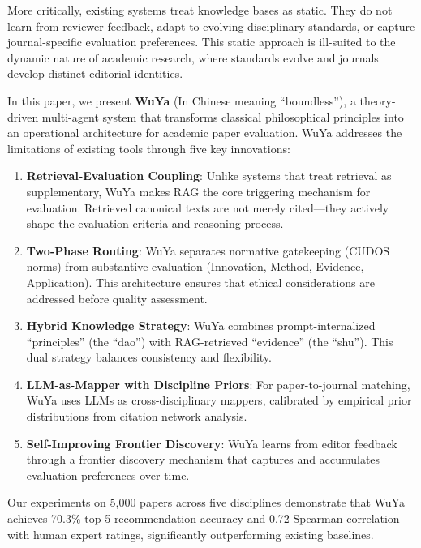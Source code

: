 \documentclass[11pt,a4paper]{article}
\newcommand{\rag}{RAG}
\begin{document}
More critically, existing systems treat knowledge bases as static. They do not learn from reviewer feedback, adapt to evolving disciplinary standards, or capture journal-specific evaluation preferences. This static approach is ill-suited to the dynamic nature of academic research, where standards evolve and journals develop distinct editorial identities.

In this paper, we present \textbf{WuYa} (In Chinese meaning ``boundless''), a theory-driven multi-agent system that transforms classical philosophical principles into an operational architecture for academic paper evaluation. WuYa addresses the limitations of existing tools through five key innovations:

\begin{enumerate}
    \item \textbf{Retrieval-Evaluation Coupling}: Unlike systems that treat retrieval as supplementary, WuYa makes \rag{} the core triggering mechanism for evaluation. Retrieved canonical texts are not merely cited---they actively shape the evaluation criteria and reasoning process.
    
    \item \textbf{Two-Phase Routing}: WuYa separates normative gatekeeping (CUDOS norms) from substantive evaluation (Innovation, Method, Evidence, Application). This architecture ensures that ethical considerations are addressed before quality assessment.
    
    \item \textbf{Hybrid Knowledge Strategy}: WuYa combines prompt-internalized ``principles'' (the ``dao'') with \rag{}-retrieved ``evidence'' (the ``shu''). This dual strategy balances consistency and flexibility.
    
    \item \textbf{LLM-as-Mapper with Discipline Priors}: For paper-to-journal matching, WuYa uses LLMs as cross-disciplinary mappers, calibrated by empirical prior distributions from citation network analysis.
    
    \item \textbf{Self-Improving Frontier Discovery}: WuYa learns from editor feedback through a frontier discovery mechanism that captures and accumulates evaluation preferences over time.
\end{enumerate}

Our experiments on 5,000 papers across five disciplines demonstrate that WuYa achieves 70.3\% top-5 recommendation accuracy and 0.72 Spearman correlation with human expert ratings, significantly outperforming existing baselines.
\end{document}
